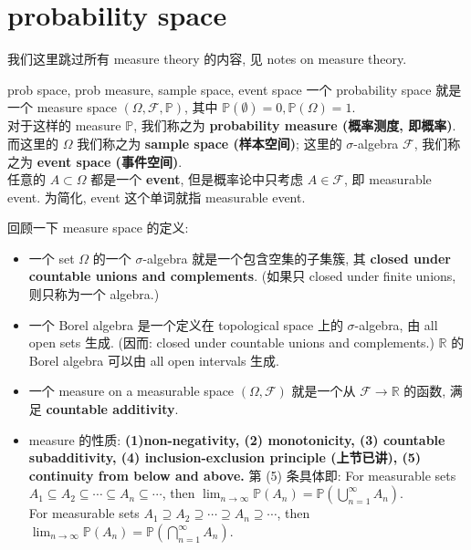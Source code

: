 \section{probability space}
我们这里跳过所有 measure theory 的内容, 见 notes on measure theory.\\
\begin{definition}{prob space, prob measure, sample space, event space}
    一个 probability space 就是一个 measure space \( (\Omega, \mathcal{F}, \mathbb{P}) \), 其中 $\mathbb{P}(\emptyset) =0, \mathbb{P}(\Omega) = 1$.\\
    对于这样的 measure $\mathbb{P}$, 我们称之为 \textbf{probability measure (概率测度, 即概率)}.\\
    而这里的 \(\Omega\) 我们称之为 \textbf{sample space (样本空间)}; 这里的 $\sigma$-algebra $\mathcal{F}$, 我们称之为 \textbf{event space (事件空间)}. \\
    任意的 $A \subset \Omega$ 都是一个 \textbf{event}, 但是概率论中只考虑 $A\in\mathcal{F}$, 即 measurable event. 为简化, event 这个单词就指 measurable event.
\end{definition}
\begin{remark}
    回顾一下 measure space 的定义:
    \begin{itemize}
        \item 一个 set $\Omega$ 的一个 $\sigma$-algebra 就是一个包含空集的子集簇, 其 \textbf{closed under countable unions and complements}. (如果只 closed under finite unions, 则只称为一个 algebra.)
        \item 一个 Borel algebra 是一个定义在 topological space 上的 $\sigma$-algebra, 由 all open sets 生成. (因而: closed under countable unions and complements.) $\mathbb{R}$ 的 Borel algebra 可以由 all open intervals 生成.
        \item 一个 measure on a measurable space $(\Omega, \mathcal{F})$ 就是一个从 $\mathcal{F} \to \mathbb{R}$ 的函数, 满足 \textbf{countable additivity}.
        \item measure 的性质: \textbf{(1)non-negativity, (2) monotonicity, (3) countable subadditivity, (4) inclusion-exclusion principle (上节已讲), (5) continuity from below and above.} 第 (5) 条具体即:
        For measurable sets $A_1 \subseteq A_2 \subseteq \cdots \subseteq A_n \subseteq \cdots$, then $\lim_{n \to \infty} \mathbb{P}(A_n) = \mathbb{P}(\bigcup_{n=1}^{\infty} A_n)$.\\
        For measurable sets $A_1 \supseteq A_2 \supseteq \cdots \supseteq A_n \supseteq \cdots$, then $\lim_{n \to \infty} \mathbb{P}(A_n) = \mathbb{P}(\bigcap_{n=1}^{\infty} A_n)$.
    \end{itemize}
\end{remark}
